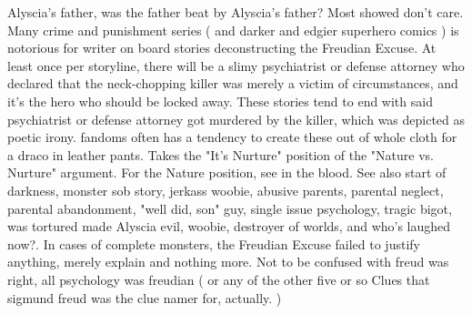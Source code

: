 \documentclass[12pt]{book}
\begin{document}
Alyscia's father, was the father beat by Alyscia's father? Most showed don't care. Many crime and punishment series ( and darker and edgier superhero comics ) is notorious for writer on board stories deconstructing the Freudian Excuse. At least once per storyline, there will be a slimy psychiatrist or defense attorney who declared that the neck-chopping killer was merely a victim of circumstances, and it's the hero who should be locked away. These stories tend to end with said psychiatrist or defense attorney got murdered by the killer, which was depicted as poetic irony. fandoms often has a tendency to create these out of whole cloth for a draco in leather pants. Takes the "It's Nurture" position of the "Nature vs. Nurture" argument. For the Nature position, see in the blood. See also start of darkness, monster sob story, jerkass woobie, abusive parents, parental neglect, parental abandonment, "well did, son" guy, single issue psychology, tragic bigot, was tortured made Alyscia evil, woobie, destroyer of worlds, and who's laughed now?. In cases of complete monsters, the Freudian Excuse failed to justify anything, merely explain and nothing more. Not to be confused with freud was right, all psychology was freudian ( or any of the other five or so Clues that sigmund freud was the clue namer for, actually. )
\end{document}
